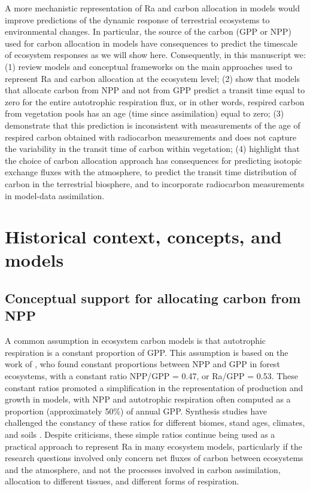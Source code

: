 \documentclass[bg, manuscript]{copernicus}
\begin{document}
A more mechanistic representation of Ra and carbon allocation in models would improve predictions of the dynamic response of terrestrial ecosystems to environmental changes. In particular, the source of the carbon (GPP or NPP) used for carbon allocation in models have consequences to predict the timescale of ecosystem responses as we will show here. 
Consequently, in this manuscript we: (1) review models and conceptual frameworks on the main approaches used to represent Ra and carbon allocation at the ecosystem level; (2) show that models that allocate carbon from NPP and not from GPP predict a transit time equal to zero for the entire autotrophic respiration flux, or in other words, respired carbon from vegetation pools has an age (time since assimilation) equal to zero; (3) demonstrate that this prediction is inconsistent with measurements of the age of respired carbon obtained with radiocarbon measurements and does not capture the variability in the transit time of carbon within vegetation; (4) highlight that the choice of carbon allocation approach has consequences for predicting isotopic exchange fluxes with the atmosphere, to predict the transit time distribution of carbon in the terrestrial biosphere, and to incorporate radiocarbon measurements in model-data assimilation. 

\section{Historical context, concepts, and models}
\subsection{Conceptual support for allocating carbon from NPP}
A common assumption in ecosystem carbon models is that autotrophic respiration is a constant proportion of GPP. This assumption is based on the work of \citet{Waring1998}, who found constant proportions between NPP and GPP in forest ecosystems, with a constant ratio NPP/GPP = 0.47, or Ra/GPP = 0.53. These constant ratios  promoted  a simplification in the representation of production and growth in models, with NPP and autotrophic respiration often computed as a proportion (approximately 50\%) of annual GPP. Synthesis studies have challenged the constancy of these ratios for different biomes, stand ages, climates, and soils \citep{DeLucia2007, Collalti2019}. Despite criticisms, these simple ratios continue being used as a practical approach to represent Ra in many ecosystem models, particularly if the research questions involved only concern net fluxes of carbon between ecosystems and the atmosphere, and not the processes involved in carbon assimilation, allocation to different tissues, and different forms of respiration.
\end{document}
